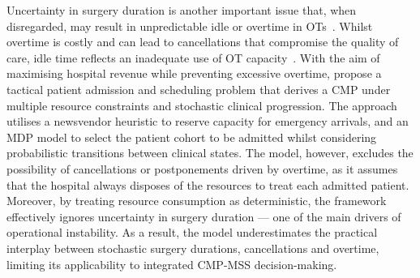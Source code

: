 Uncertainty in surgery duration is another important issue that, when disregarded, may result in unpredictable idle or overtime in OTs~\citep{shehadeh2022stochastic}. 
Whilst overtime is costly and can lead to  cancellations that compromise the quality of care, idle time reflects an inadequate use of OT capacity~\citep{shehadeh2022stochastic, Harris2022, Kayvanfar2025}. 
With the aim of maximising hospital revenue while preventing excessive overtime, \citet{Barz2015} propose a tactical patient admission and scheduling problem that derives a CMP under multiple resource constraints and stochastic clinical progression. 
The approach utilises a newsvendor heuristic to reserve capacity for emergency arrivals, and an MDP model to select the patient cohort to be admitted whilst considering probabilistic transitions between clinical states. 
The model, however, excludes the possibility of cancellations or postponements driven by overtime, as it assumes that the hospital always disposes of the resources to treat each admitted patient. 
Moreover, by treating resource consumption as deterministic, the framework effectively ignores uncertainty in surgery duration --- one of the main drivers of operational instability. 
As a result, the model underestimates the practical interplay between stochastic surgery durations, cancellations and overtime, limiting its applicability to integrated CMP-MSS decision-making.


